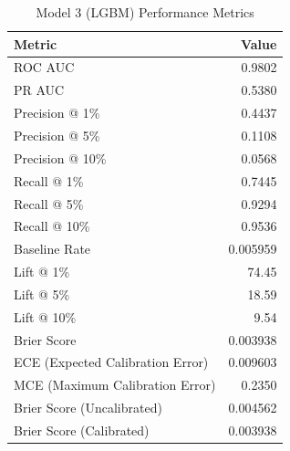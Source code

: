 \begin{table}[h]
\centering
\begin{tabular}{lr}
\toprule
Metric & Value \\
\midrule
ROC AUC & 0.9802 \\
PR AUC & 0.5380 \\
Precision @ 1\% & 0.4437 \\
Precision @ 5\% & 0.1108 \\
Precision @ 10\% & 0.0568 \\
Recall @ 1\% & 0.7445 \\
Recall @ 5\% & 0.9294 \\
Recall @ 10\% & 0.9536 \\
Baseline Rate & 0.005959 \\
Lift @ 1\% & 74.45 \\
Lift @ 5\% & 18.59 \\
Lift @ 10\% & 9.54 \\
Brier Score & 0.003938 \\
ECE (Expected Calibration Error) & 0.009603 \\
MCE (Maximum Calibration Error) & 0.2350 \\
Brier Score (Uncalibrated) & 0.004562 \\
Brier Score (Calibrated) & 0.003938 \\
\bottomrule
\end{tabular}
\caption{Model 3 (LGBM) Performance Metrics}
\label{tab:model3_lgbm_metrics}
\end{table}
